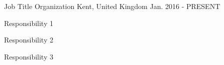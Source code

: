 

\begin{cventries}

  \cventry
    {Job Title} %
    {Organization} %
    {Kent, United Kingdom} %
    {Jan. 2016 - PRESENT} %
    {
      \begin{cvitems} %
        \item {Responsibility 1}
        \item {Responsibility 2}
        \item {Responsibility 3}
      \end{cvitems}
    }

\end{cventries}
